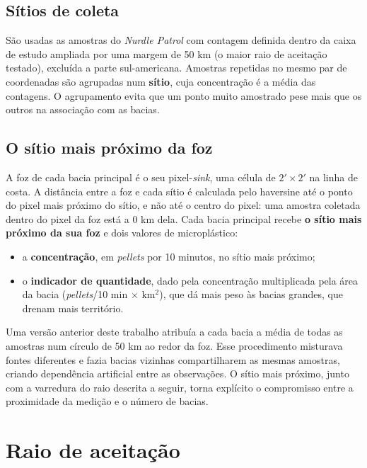 \subsection{Sítios de coleta}

São usadas as amostras do \textit{Nurdle Patrol} com contagem definida dentro da caixa de estudo ampliada por uma margem de 50 km (o maior raio de aceitação testado), excluída a parte sul-americana. Amostras repetidas no mesmo par de coordenadas são agrupadas num \textbf{sítio}, cuja concentração é a média das contagens. O agrupamento evita que um ponto muito amostrado pese mais que os outros na associação com as bacias.

\subsection{O sítio mais próximo da foz}

A foz de cada bacia principal é o seu pixel-\textit{sink}, uma célula de $2' \times 2'$ na linha de costa. A distância entre a foz e cada sítio é calculada pelo haversine até o ponto do pixel mais próximo do sítio, e não até o centro do pixel: uma amostra coletada dentro do pixel da foz está a 0 km dela. Cada bacia principal recebe \textbf{o sítio mais próximo da sua foz} e dois valores de microplástico:

\begin{itemize}
	\item a \textbf{concentração}, em \textit{pellets} por 10 minutos, no sítio mais próximo;
	\item o \textbf{indicador de quantidade}, dado pela concentração multiplicada pela área da bacia (\textit{pellets}/10 min $\times$ km$^2$), que dá mais peso às bacias grandes, que drenam mais território.
\end{itemize}

Uma versão anterior deste trabalho atribuía a cada bacia a média de todas as amostras num círculo de 50 km ao redor da foz. Esse procedimento misturava fontes diferentes e fazia bacias vizinhas compartilharem as mesmas amostras, criando dependência artificial entre as observações. O sítio mais próximo, junto com a varredura do raio descrita a seguir, torna explícito o compromisso entre a proximidade da medição e o número de bacias.

\section{Raio de aceitação}
\label{sec:met-raio}

